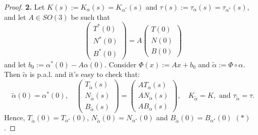 \begin{proof}
\noindent\textbf{2.} Let $K(s) := K_\alpha(s) = K_{\alpha^*}(s)$ and $\tau(s) := \tau_\alpha(s) = \tau_{\alpha^*}(s)$, and let $A\in SO(3)$ be such that
\[
\begin{pmatrix}T^*(0)\\ N^*(0)\\ B^*(0)\end{pmatrix} = A\begin{pmatrix}T(0)\\ N(0)\\ B(0)\end{pmatrix}
\]
and let $b_0 := \alpha^*(0) - A\alpha(0)$. Consider $\Phi(x) := Ax + b_0$ and $\tilde{\alpha} := \Phi\circ\alpha$. Then $\tilde{\alpha}$ is p.a.l. and it's easy to check that:
\[
\tilde{\alpha}(0) = \alpha^*(0), \quad
\begin{pmatrix}T_{\tilde{\alpha}}(s)\\ N_{\tilde{\alpha}}(s)\\ B_{\tilde{\alpha}}(s)\end{pmatrix} = \begin{pmatrix}AT_\alpha(s)\\ AN_\alpha(s)\\ AB_\alpha(s)\end{pmatrix},
\quad K_{\tilde{\alpha}} = K, \text{ and } \tau_{\tilde{\alpha}} = \tau.
\]
Hence, $T_{\tilde{\alpha}}(0) = T_{\alpha^*}(0)$, $N_{\tilde{\alpha}}(0) = N_{\alpha^*}(0)$ and $B_{\tilde{\alpha}}(0) = B_{\alpha^*}(0)$ \hfill $(*)$.


\end{proof}

